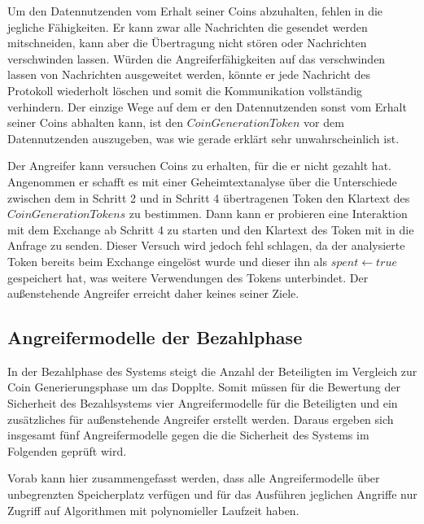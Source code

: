 \documentclass[
	fontsize=12pt,
	headings=small,
	parskip=half,           %
	bibliography=totoc,
	numbers=noenddot,       %
	open=any,               %
]{scrreprt}
\begin{document}
Um den Datennutzenden vom Erhalt seiner Coins abzuhalten, fehlen in die jegliche Fähigkeiten. Er kann zwar alle Nachrichten die gesendet werden mitschneiden, kann aber die Übertragung nicht stören oder Nachrichten verschwinden lassen. Würden die Angreiferfähigkeiten auf das verschwinden lassen von Nachrichten ausgeweitet werden, könnte er jede Nachricht des Protokoll wiederholt löschen und somit die Kommunikation vollständig verhindern. Der einzige Wege auf dem er den Datennutzenden sonst vom Erhalt seiner Coins abhalten kann, ist den $CoinGenerationToken$ vor dem Datennutzenden auszugeben, was wie gerade erklärt sehr unwahrscheinlich ist.

Der Angreifer kann versuchen Coins zu erhalten, für die er nicht gezahlt hat. Angenommen er schafft es mit einer Geheimtextanalyse über die Unterschiede zwischen dem in Schritt 2 und in Schritt 4 übertragenen Token den Klartext des $CoinGenerationTokens$ zu bestimmen. Dann kann er probieren eine Interaktion mit dem Exchange ab Schritt 4 zu starten und den Klartext des Token mit in die Anfrage zu senden. Dieser Versuch wird jedoch fehl schlagen, da der analysierte Token bereits beim Exchange eingelöst wurde und dieser ihn als $spent\leftarrow true$ gespeichert hat, was weitere Verwendungen des Tokens unterbindet. Der außenstehende Angreifer erreicht daher keines seiner Ziele.

\subsection{Angreifermodelle der Bezahlphase}
\label{subsec:adversaryPayment}
In der Bezahlphase des Systems steigt die Anzahl der Beteiligten im Vergleich zur Coin Generierungsphase um das Dopplte. Somit müssen für die Bewertung der Sicherheit des Bezahlsystems vier Angreifermodelle für die Beteiligten und ein zusätzliches für außenstehende Angreifer erstellt werden. Daraus ergeben sich insgesamt fünf Angreifermodelle gegen die die Sicherheit des Systems im Folgenden geprüft wird.

Vorab kann hier zusammengefasst werden, dass alle Angreifermodelle über unbegrenzten Speicherplatz verfügen und für das Ausführen jeglichen Angriffe nur Zugriff auf Algorithmen mit polynomieller Laufzeit haben.
\end{document}
